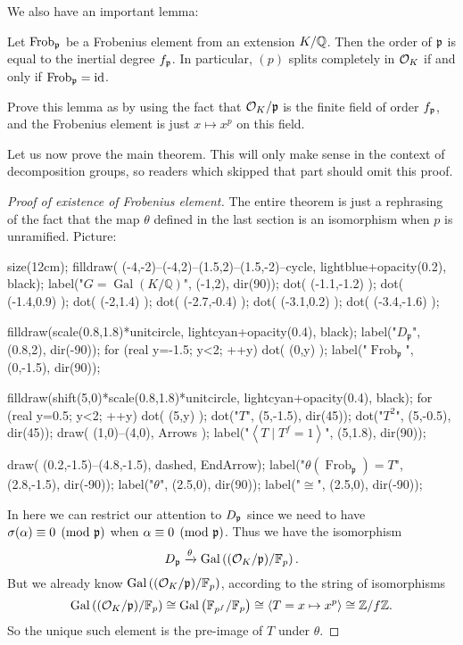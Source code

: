 We also have an important lemma:
\begin{lemma}
	Let $\mathrm{Frob}_\mathfrak p$ be a Frobenius element from an extension $K/\mathbb Q$.
	Then the order of $\mathfrak p$ is equal to the inertial degree $f_\mathfrak p$.
	In particular, $(p)$ splits completely in $\mathcal O_K$
	if and only if $\mathrm{Frob}_\mathfrak p = \mathrm{id}$.
\end{lemma}
\begin{exercise}
	Prove this lemma as by using the fact that $\mathcal O_K / \mathfrak p$
	is the finite field of order $f_\mathfrak p$,
	and the Frobenius element is just $x \mapsto x^p$ on this field.
\end{exercise}

Let us now prove the main theorem.
This will only make sense in the context of decomposition groups,
so readers which skipped that part should omit this proof.
\begin{proof}
	[Proof of existence of Frobenius element]
	The entire theorem is just a rephrasing of the fact
	that the map $\theta$ defined in the last section
	is an isomorphism when $p$ is unramified.
	Picture:
	\begin{center}
		\begin{asy}
			size(12cm);
			filldraw( (-4,-2)--(-4,2)--(1.5,2)--(1.5,-2)--cycle, lightblue+opacity(0.2), black);
			label("$G = \operatorname{Gal}(K/\mathbb Q)$", (-1,2), dir(90));
			dot( (-1.1,-1.2) );
			dot( (-1.4,0.9) );
			dot( (-2,1.4) );
			dot( (-2.7,-0.4) );
			dot( (-3.1,0.2) );
			dot( (-3.4,-1.6) );

			filldraw(scale(0.8,1.8)*unitcircle, lightcyan+opacity(0.4), black);
			label("$D_{\mathfrak p}$", (0.8,2), dir(-90));
			for (real y=-1.5; y<2; ++y) { dot( (0,y) ); }
			label("$\operatorname{Frob}_{\mathfrak p}$", (0,-1.5), dir(90));

			filldraw(shift(5,0)*scale(0.8,1.8)*unitcircle, lightcyan+opacity(0.4), black);
			for (real y=0.5; y<2; ++y) { dot( (5,y) ); }
			dot("$T$", (5,-1.5), dir(45));
			dot("$T^2$", (5,-0.5), dir(45));
			draw( (1,0)--(4,0), Arrows );
			label("$\left<T \mid T^f=1\right>$", (5,1.8), dir(90));

			draw( (0.2,-1.5)--(4.8,-1.5), dashed, EndArrow);
			label("$\theta(\operatorname{Frob}_{\mathfrak p}) = T$", (2.8,-1.5), dir(-90));
			label("$\theta$", (2.5,0), dir(90));
			label("$\cong$", (2.5,0), dir(-90));
		\end{asy}
	\end{center}
	In here we can restrict our attention to $D_\mathfrak p$
	since we need to have $\sigma(\alpha) \equiv 0 \pmod {\mathfrak p}$
	when $\alpha \equiv 0 \pmod {\mathfrak p}$.
	Thus we have the isomorphism
	\[ D_\mathfrak p \xrightarrow{\theta} \operatorname{Gal}\left( (\mathcal O_K/\mathfrak p) / \mathbb F_p \right). \]
	But we already know $\operatorname{Gal}\left( (\mathcal O_K/\mathfrak p)/\mathbb F_p \right)$,
	according to the string of isomorphisms
	\[
		\operatorname{Gal}\left( (\mathcal O_K/\mathfrak p) / \mathbb F_p \right)
		\cong \operatorname{Gal}\left( \mathbb F_{p^f} / \mathbb F_p \right)
		\cong \left< T = x \mapsto x^p \right>
		\cong \mathbb Z/f\mathbb Z .
	\]
	So the unique such element is the pre-image of $T$ under $\theta$.
\end{proof}


